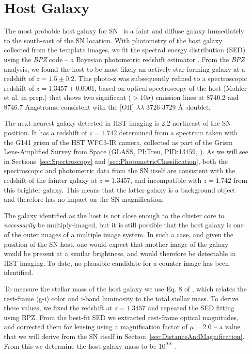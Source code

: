 \section{Host Galaxy}
\label{sec:HostGalaxy}

The most probable host galaxy for SN \tomas\ is a faint and diffuse
galaxy immediately to the south-east of the SN location.  With
photometry of the host galaxy collected from the template images, we
fit the spectral energy distribution (SED) using the {\it BPZ} code --
a Bayesian photometric redshift estimator \citep{Benitez:2000}. 
From the {\it BPZ} analysis, we found the host to be most likely an
actively star-forming galaxy at a redshift of
$z=1.5\pm0.2$.  This photo-z was subsequently refined to a
spectroscopic redshift of $z=1.3457\pm0.0001$, based on optical
spectroscopy of the host (Mahler et al. in prep.) that shows two
significant ($>10\sigma$) emission lines at 8740.2 and 8746.7
Angstroms, consistent with the [OII] $\lambda\lambda$ 3726-3729 \AA\
doublet.  

The next nearest galaxy detected in HST imaging is 2.2\arcsec
northeast of the SN position. It has a redshift of $z=1.742$
determined from a spectrum taken with the G141 grism of the HST
WFC3-IR camera, collected as part of the Grism Lens-Amplified Survey
from Space (GLASS, PI:Treu, PID:13459, \citealt{Treu:2015,Schmidt:2014}).  As we
will see in Sections~\ref{sec:Spectroscopy}
and \ref{sec:PhotometricClassification}, both the spectroscopic and
photometric data from the SN itself are consistent with the
redshift of the fainter galaxy at $z=1.3457$, and
incompatible with $z=1.742$ from this brighter galaxy.  This means
that the latter galaxy is a background object and therefore has no
impact on the SN magnification.

The galaxy identified as the host is not close enough to the cluster
core to {\it necessarily} be multiply-imaged, but it is still possible
that the host galaxy is one of the outer images of a multiple image
system.  In such a case, and given the position of the SN host, one
would expect that another image of the galaxy would be present at a
similar brightness, and would therefore be detectable in HST
imaging. To date, no plausible candidate for a counter-image has been
identified.


To measure the stellar mass of the host galaxy
we use Eq. 8 of \citet{Taylor:2011}, which relates the rest-frame
(g-i) color and i-band luminosity to the total stellar mass. To derive
these values, we fixed the redshift at $z=1.3457$ and repeated the SED
fitting using BPZ. From the best-fit SED we extracted rest-frame
optical magnitudes, and corrected them for lensing using a
magnification factor of $\mu=2.0$ -- a value that we will derive from
the SN itself in Section~\ref{sec:DistanceAndMagnification}.  From
this we determine the host galaxy mass to be $10^{9.8}$ \Msun.


